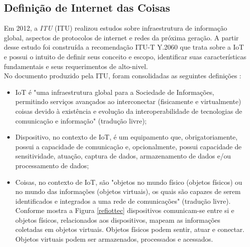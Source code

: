 \subsection{Definição de Internet das Coisas}
	\quad Em 2012, a \textit{\acrlong{ITU}} (\acrshort{ITU}) realizou estudos sobre infraestrutura
	de informação global, aspectos de protocolos de internet e redes da próxima geração.
	A partir desse estudo foi construída a recomendação ITU-T Y.2060 \cite{ITU} que trata sobre a \acrlong{IoT}
	e possui o intuito de definir seus conceito e escopo, identificar
	suas características fundamentais e seus requerimentos de alto-nivel.
  \\ \null
  \quad	No documento produzido pela \acrshort{ITU}, foram consolidadas as seguintes definições \cite{ITU}:
	\begin{itemize}
		\item \acrlong{IoT} é "uma infraestrutura global para a Sociedade de Informações, permitindo serviços avançados ao
		interconectar (fisicamente e virtualmente) coisas devido à existência e evolução da interoperabilidade
	de tecnologias de comunicação e informação" (tradução livre);%
		\item Dispositivo, no contexto de \acrshort{IoT}, é um equipamento que, obrigatoriamente, possui a capacidade
		de comunicação e, opcionalmente, possui capacidade de sensitividade, atuação, captura de dados,
		armazenamento de dados e/ou processamento de dados;
		\item Coisas, no contexto de \acrshort{IoT}, são "objetos
	no mundo físico (objetos físicos) ou no mundo das informações (objetos virtuais), os quais são capazes
	de serem identificados e integrados a uma rede de comunicações" (tradução livre). Conforme mostra a Figura \ref{refiottec} dispositivos comunicam-se entre si e objetos físicos, relacionados aos dispositivos, mapeam as informações coletadas em objetos virtuais. Objetos físicos podem sentir, atuar e conectar.
	Objetos virtuais podem ser armazenados, processados e acessados.
	\end{itemize}

